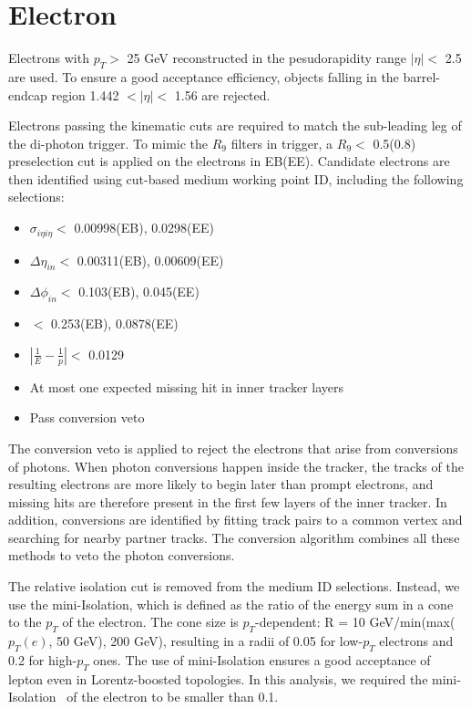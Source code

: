 \documentclass[thesis.tex]{subfiles}
\renewcommand\_{\textunderscore\allowbreak}
\begin{document}
\section{Electron}
\label{subsec:electronID} 
Electrons with  $p_{T} >$ 25 GeV reconstructed in the pesudorapidity range $|\eta| <$ 2.5 are used. To ensure a good acceptance efficiency, objects falling in the barrel-endcap region 1.442 $< |\eta| <$ 1.56 are rejected. 

Electrons passing the kinematic cuts are required to match the sub-leading leg of the di-photon trigger. 
To mimic the $R_9$ filters in trigger, a $R_9 <$ 0.5(0.8) preselection cut is applied on the electrons in EB(EE). 
Candidate electrons are then identified using cut-based medium working point ID, including the following selections:

\begin{center}
\begin{itemize}
\item $\sigma_{i\eta i\eta} <$ 0.00998(EB), 0.0298(EE)
\item $\Delta\eta_{in} <$ 0.00311(EB), 0.00609(EE)
\item $\Delta\phi_{in} <$ 0.103(EB), 0.045(EE)
\item \HoverE $<$ 0.253(EB), 0.0878(EE)
\item $|\frac{1}{E} - \frac{1}{p}| <$ 0.0129
\item At most one expected missing hit in inner tracker layers
\item Pass conversion veto
\end{itemize}
\end{center}

The conversion veto is applied to reject the electrons that arise from conversions of photons.
When photon conversions happen inside the tracker, the tracks of the resulting electrons are more likely to begin later than prompt electrons, and missing hits are therefore present in the first few layers of the inner tracker. 
In addition, conversions are identified by fitting track pairs to a common vertex and searching for nearby partner tracks.
The conversion algorithm combines all these methods to veto the photon conversions.

The relative isolation cut is removed from the medium ID selections. 
Instead, we use the mini-Isolation, which is defined as the ratio of the energy sum in a cone to the $p_T$ of the electron.
The cone size is $p_T$-dependent: R = 10 GeV/min(max($p_T(e)$, 50 GeV), 200 GeV), resulting in a radii of 0.05 for low-$p_T$ electrons and 0.2 for high-$p_T$ ones. 
The use of mini-Isolation ensures a good acceptance of lepton even in Lorentz-boosted topologies.
In this analysis, we required the mini-Isolation~\cite{CMS:Isolation} of the electron to be smaller than 0.1. 
\end{document}
